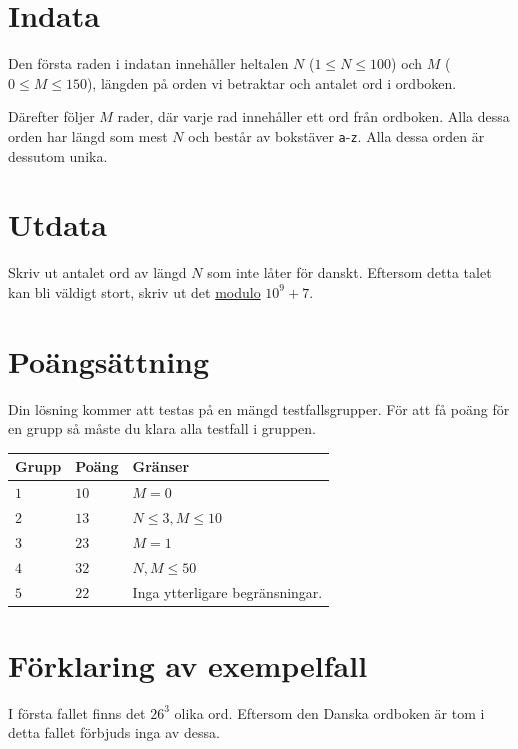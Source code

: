 \section*{Indata}
Den första raden i indatan innehåller heltalen $N$ ($1 \le N \le 100$) och $M$ ($0 \le M \le 150$),
längden på orden vi betraktar och antalet ord i ordboken.

Därefter följer $M$ rader, där varje rad innehåller ett ord från ordboken. Alla dessa orden har längd som mest $N$
och består av bokstäver \texttt{a}-\texttt{z}. Alla dessa orden är dessutom unika.


\section*{Utdata}
Skriv ut antalet ord av längd $N$ som inte låter för danskt. Eftersom detta talet kan bli väldigt stort,
skriv ut det \href{https://en.wikipedia.org/wiki/Modulo}{modulo} $10^9+7$. 

\section*{Poängsättning}
Din lösning kommer att testas på en mängd testfallsgrupper.
För att få poäng för en grupp så måste du klara alla testfall i gruppen.

\noindent
\begin{tabular}{| l | l | p{12cm} |}
  \hline
  \textbf{Grupp} & \textbf{Poäng} & \textbf{Gränser} \\ \hline
  $1$    & $10$       & $M = 0$ \\ \hline
  $2$    & $13$       & $N \leq 3, M \leq 10$ \\ \hline
  $3$    & $23$       & $M = 1$ \\ \hline
  $4$    & $32$       & $N, M \leq 50$ \\ \hline
  $5$    & $22$       & Inga ytterligare begränsningar. \\ \hline
\end{tabular}

\section*{Förklaring av exempelfall}
I första fallet finns det $26^3$ olika ord. Eftersom den Danska ordboken är tom i detta fallet förbjuds inga av dessa.
